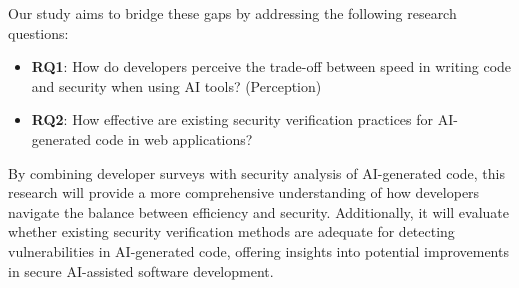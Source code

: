 Our study aims to bridge these gaps by addressing the following research questions:
\begin{itemize}
    \item \textbf{RQ1}: How do developers perceive the trade-off between speed in writing code and security when using AI tools? (Perception)
    \item \textbf{RQ2}: How effective are existing security verification practices for AI-generated code in web applications?
\end{itemize}

By combining developer surveys with security analysis of AI-generated code, this research will provide a more comprehensive understanding of how developers navigate the balance between efficiency and security. Additionally, it will evaluate whether existing security verification methods are adequate for detecting vulnerabilities in AI-generated code, offering insights into potential improvements in secure AI-assisted software development.
